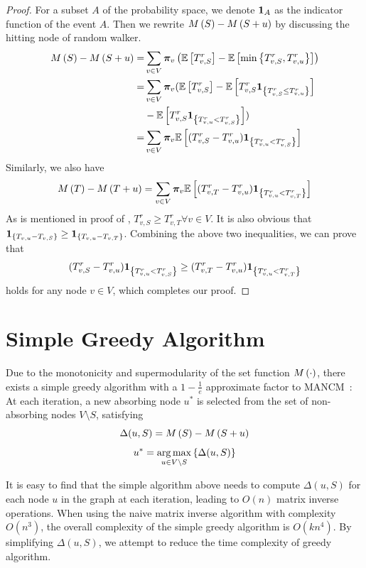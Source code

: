 \documentclass[sigconf]{acmart}
\begin{document}
\begin{proof}
    For a subset \(A\) of the probability space, we denote \(\boldsymbol{1}_A\) as the indicator function of the event \(A\). Then we rewrite \(M\left(S\right)-M\left(S+u\right)\) by discussing the hitting node of random walker.
    \begin{align*}
        M\left(S\right)-M\left(S+u\right)
        = & \sum_{v\in V}\boldsymbol{\pi}_v\left( \mathbb{E}\left[T_{v,S}^r\right]-\mathbb{E}\left[\min\left\{T_{v,S}^r,T_{v,u}^r \right\}\right] \right)            \\
        = & \sum_{v\in V}\boldsymbol{\pi}_v(\mathbb{E}\left[T_{v,S}^r\right]-\mathbb{E}\left[T_{v,S}^r\boldsymbol{1}_{\left\{T_{v,S}^r\le T_{v,u}^r \right\}}\right] \\
          & -\mathbb{E}\left[T_{v,S}^r\boldsymbol{1}_{\left\{T_{v,u}^r<T_{v,S}^r \right\}}\right])                                         \\
        = & \sum_{v\in V}\boldsymbol{\pi}_v\mathbb{E}\left[(T_{v,S}^r-T_{v,u}^r)\boldsymbol{1}_{\left\{T_{v,u}^r<T_{v,S}^r \right\}}\right]
    \end{align*}
    Similarly, we also have
    \[M\left(T\right)-M\left(T+u\right)=\sum_{v\in V}\boldsymbol{\pi}_v\mathbb{E}\left[(T_{v,T}^r-T_{v,u}^r)\boldsymbol{1}_{\left\{T_{v,u}^r<T_{v,T}^r \right\}}\right]\]
    As is mentioned in proof of , \(T_{v,S}^r\ge T_{v,T}^r\forall v\in V\).
    It is also obvious that \(\boldsymbol{1}_{\left\{T_{v,u}-T_{v,S} \right\}}\ge\boldsymbol{1}_{\left\{T_{v,u}-T_{v,T} \right\}}\).
    Combining the above two inequalities, we can prove that
    \[(T_{v,S}^r-T_{v,u}^r)\boldsymbol{1}_{\left\{T_{v,u}^r<T_{v,S}^r \right\}}\ge(T_{v,T}^r-T_{v,u}^r)\boldsymbol{1}_{\left\{T_{v,u}^r<T_{v,T}^r \right\}}\]
    holds for any node \(v\in V\), which completes our proof.
\end{proof}

\section{Simple Greedy Algorithm}\label{sec:simple-greedy}

Due to the monotonicity and supermodularity of the set function \(M\left(\cdot\right)\), there exists a simple greedy algorithm with a \(1-\frac1e\) approximate factor to MANCM~\cite{NeWoFi78}:
At each iteration, a new absorbing node \(u^*\) is selected from the set of non-absorbing nodes \(V\setminus S\), satisfying
\[\Delta(u,S)=M\left(S\right)-M\left(S+u\right)\]
\[u^*=\operatorname*{arg\,max}_{u\in V\setminus S}\left\{\Delta(u,S) \right\}\]

It is easy to find that the simple algorithm above needs to compute \(\Delta(u,S)\) for each node \(u\) in the graph at each iteration, leading to \(O(n)\) matrix inverse operations.
When using the naive matrix inverse algorithm with complexity \(O(n^3)\), the overall complexity of the simple greedy algorithm is \(O(kn^4)\).
By simplifying \(\Delta(u,S)\), we attempt to reduce the time complexity of greedy algorithm.
\end{document}
